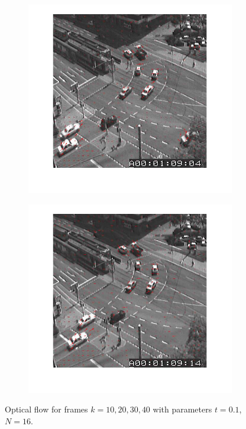 \documentclass[a4paper]{iacas}
\begin{document}
\begin{figure}[!htbp]
	\begin{subfigure}[b]{0.4\textwidth}
		\includegraphics[width=\textwidth]{304.jpg}
		\caption{}
		\label{fig:304}
	\end{subfigure}
	\begin{subfigure}[b]{0.4\textwidth}
		\includegraphics[width=\textwidth]{305.jpg}
		\caption{}
		\label{fig:305}
	\end{subfigure}
	
	\label{fig:300}
	\caption{Optical flow for frames $k=10, 20, 30,40$ with parameters $t=0.1$, $N=16$.}
\end{figure}
\end{document}
